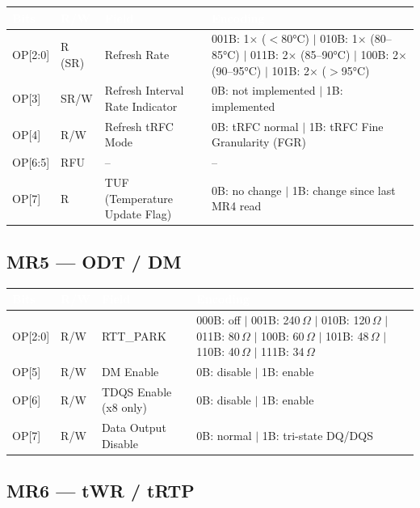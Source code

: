 \documentclass[10pt,a4paper,twoside]{article}
\newcommand{\thd}[1]{\cellcolor{navyblue}\textcolor{white}{\textbf{#1}}}
\newcommand{\trow}{\rowcolor{lightgray}}
\newcommand{\talt}{\rowcolor{skyblue!30}}
\begin{document}
\begin{center}
\begin{tabularx}{\linewidth}{@{} l l l X @{}}
\toprule
\thd{Bits} & \thd{R/W} & \thd{Field} & \thd{Encoding} \\
\midrule
\trow OP[2:0] & R (SR) & Refresh Rate &
  001B: 1$\times$ ($<$80°C) $|$ 010B: 1$\times$ (80--85°C) $|$
  011B: 2$\times$ (85--90°C) $|$ 100B: 2$\times$ (90--95°C) $|$ 101B: 2$\times$ ($>$95°C) \\
\talt OP[3] & SR/W & Refresh Interval Rate Indicator &
  0B: not implemented $|$ 1B: implemented \\
\trow OP[4] & R/W & Refresh tRFC Mode &
  0B: tRFC normal $|$ 1B: tRFC Fine Granularity (FGR) \\
\talt OP[6:5] & RFU & -- & -- \\
\trow OP[7] & R & TUF (Temperature Update Flag) &
  0B: no change $|$ 1B: change since last MR4 read \\
\bottomrule
\end{tabularx}
\end{center}

\subsection{MR5 --- ODT / DM}

\begin{center}
\begin{tabularx}{\linewidth}{@{} l l l X @{}}
\toprule
\thd{Bits} & \thd{R/W} & \thd{Field} & \thd{Encoding} \\
\midrule
\trow OP[2:0] & R/W & RTT\_PARK &
  000B: off $|$ 001B: 240\,$\Omega$ $|$ 010B: 120\,$\Omega$ $|$ 011B: 80\,$\Omega$ $|$
  100B: 60\,$\Omega$ $|$ 101B: 48\,$\Omega$ $|$ 110B: 40\,$\Omega$ $|$ 111B: 34\,$\Omega$ \\
\talt OP[5] & R/W & DM Enable & 0B: disable $|$ 1B: enable \\
\trow OP[6] & R/W & TDQS Enable (x8 only) & 0B: disable $|$ 1B: enable \\
\talt OP[7] & R/W & Data Output Disable & 0B: normal $|$ 1B: tri-state DQ/DQS \\
\bottomrule
\end{tabularx}
\end{center}

\subsection{MR6 --- tWR / tRTP}
\end{document}
